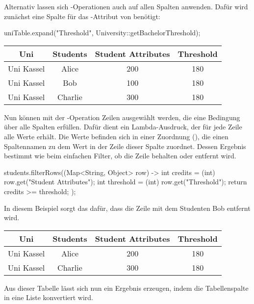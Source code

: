 Alternativ lassen sich -Operationen auch auf allen Spalten anwenden.
Dafür wird zunächst eine Spalte für das -Attribut von  benötigt:

\begin{jcodeblock}
    uniTable.expand("Threshold", University::getBachelorThreshold);
\end{jcodeblock}

\begin{tabular}{|c|c|c|c|}
    \hline
    \textbf{Uni} & \textbf{Students} & \textbf{Student Attributes} & \textbf{Threshold} \\
    \hline
    Uni Kassel & Alice   & 200 & 180 \\
    Uni Kassel & Bob     & 100 & 180 \\
    Uni Kassel & Charlie & 300 & 180 \\
    \hline
\end{tabular}

Nun können mit der -Operation Zeilen ausgewählt werden, die eine Bedingung über alle Spalten erfüllen.
Dafür dient ein Lambda-Ausdruck, der für jede Zeile alle Werte erhält.
Die Werte befinden sich in einer Zuordnung (), die einen Spaltennamen zu dem Wert in der Zeile dieser Spalte zuordnet.
Dessen Ergebnis bestimmt wie beim einfachen Filter, ob die Zeile behalten oder entfernt wird.

\begin{jcodeblock}
    students.filterRows((Map<String, Object> row) -> {
        int credits = (int) row.get("Student Attributes");
        int threshold = (int) row.get("Threshold");
        return credits >= threshold;
    });
\end{jcodeblock}

In diesem Beispiel sorgt das dafür, dass die Zeile mit dem Studenten Bob entfernt wird.

\begin{tabular}{|c|c|c|c|}
    \hline
    \textbf{Uni} & \textbf{Students} & \textbf{Student Attributes} & \textbf{Threshold} \\
    \hline
    Uni Kassel & Alice   & 200 & 180 \\
    Uni Kassel & Charlie & 300 & 180 \\
    \hline
\end{tabular}

Aus dieser Tabelle lässt sich nun ein Ergebnis erzeugen, indem die Tabellenspalte  in eine Liste konvertiert wird.

